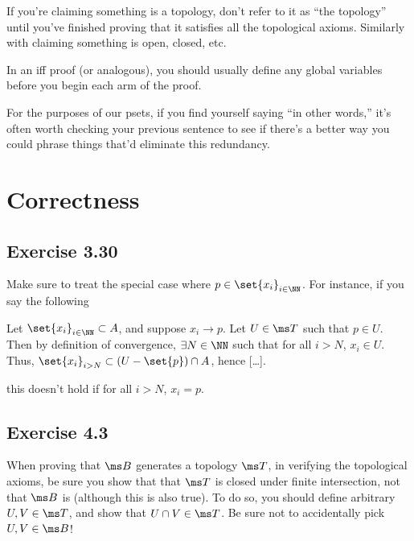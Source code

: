 \documentclass{fkpset}
\begin{document}
\begin{problem}[A6]
  If you're claiming something is a topology, don't refer to it as ``the
  topology'' until you've finished proving that it satisfies all the topological
  axioms. Similarly with claiming something is open, closed, etc.
\end{problem}
\begin{problem}[A8]
  In an iff proof (or analogous), you should usually define any global variables
  before you begin each arm of the proof.
\end{problem}
\begin{problem}[A9]
  For the purposes of our psets, if you find yourself saying ``in other words,''
  it's often worth checking your previous sentence to see if there's a better
  way you could phrase things that'd eliminate this redundancy.
\end{problem}
\section{Correctness}
\subsection{Exercise 3.30}
\begin{problem}[B1]
  Make sure to treat the special case where $p \in \set{x_i}_{i \in \NN}$. For
  instance, if you say the following
  \begin{leftbar}
    Let $\set{x_i}_{i\in\NN} \subset A$, and suppose $x_i \to p$. Let $U \in \ms
    T$ such that $p \in U$. Then by definition of convergence, $\exists N \in
    \NN$ such that for all $i > N$, $x_i \in U$. Thus, {\color{red}
      $\set{x_i}_{i>N} \subset (U - \set{p}) \cap A$}, hence [\ldots].
  \end{leftbar}
  this doesn't hold if for all $i > N$, $x_i = p$.
\end{problem}
\subsection{Exercise 4.3}
\begin{problem}[B2]
  When proving that $\ms B$ generates a topology $\ms T$, in verifying the
  topological axioms, be sure you show that that $\ms T$ is closed under finite
  intersection, not that $\ms B$ is (although this is also true). To do so, you
  should define arbitrary $U,V \in \ms T$, and show that $U \cap V \in \ms T$.
  Be sure not to accidentally pick $U,V \in \ms B$!
\end{problem}
\end{document}
